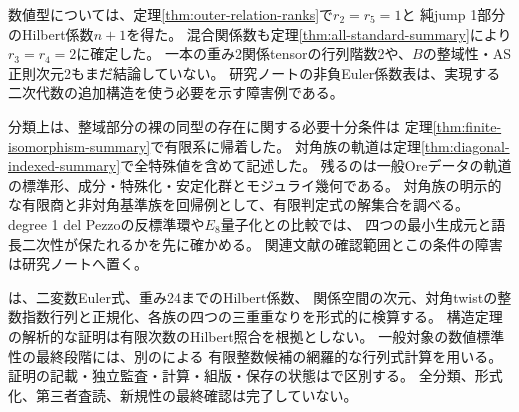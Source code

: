 \documentclass[11pt,a4paper]{ltjsarticle}
\theoremstyle{definition}
\begin{document}
数値型については、定理\ref{thm:outer-relation-ranks}で$r_2=r_5=1$と
純jump 1部分のHilbert係数$n+1$を得た。
混合関係数も定理\ref{thm:all-standard-summary}により$r_3=r_4=2$に確定した。
一本の重み2関係tensorの行列階数2や、$B$の整域性・AS正則次元2もまだ結論していない。
研究ノートの非負Euler係数表は、実現する二次代数の追加構造を使う必要を示す障害例である。

分類上は、整域部分の裸の同型の存在に関する必要十分条件は
定理\ref{thm:finite-isomorphism-summary}で有限系に帰着した。
対角族の軌道は定理\ref{thm:diagonal-indexed-summary}で全特殊値を含めて記述した。
残るのは一般Oreデータの軌道の標準形、成分・特殊化・安定化群とモジュライ幾何である。
対角族の明示的な有限商と非対角基準族を回帰例として、有限判定式の解集合を調べる。
degree 1 del Pezzoの反標準環や$E_8$量子化との比較では、
四つの最小生成元と語長二次性が保たれるかを先に確かめる。
関連文献の確認範囲とこの条件の障害は研究ノートへ置く。

は、二変数Euler式、重み24までのHilbert係数、
関係空間の次元、対角twistの整数指数行列と正規化、各族の四つの三重重なりを形式的に検算する。
構造定理の解析的な証明は有限次数のHilbert照合を根拠としない。
一般対象の数値標準性の最終段階には、別のによる
有限整数候補の網羅的な行列式計算を用いる。
証明の記載・独立監査・計算・組版・保存の状態はで区別する。
全分類、形式化、第三者査読、新規性の最終確認は完了していない。
\end{document}
